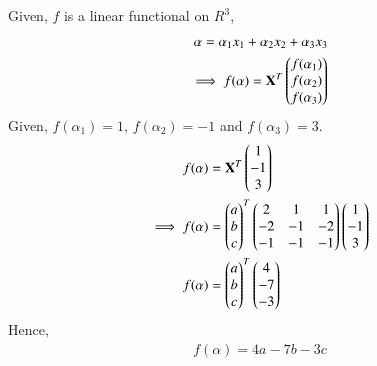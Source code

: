\documentclass[journal,12pt,twocolumn]{IEEEtran}
\begin{document}
Given, $f$ is a linear functional on $R^3$,
\begin{align}
\mathbf{\alpha} = \alpha_1 x_1 + \alpha_2 x_2 + \alpha_3 x_3\\
\implies f(\alpha) = \mathbf{X}^T \begin{pmatrix}f(\alpha_1)\\f(\alpha_2)\\f(\alpha_3)\end{pmatrix}
\end{align}
Given, $f(\alpha_1)=1$, $f(\alpha_2)=-1$ and $f(\alpha_3)=3$.
\begin{align}
 f(\alpha) &= \mathbf{X}^T \begin{pmatrix}1\\-1\\3\end{pmatrix}\\
\implies f(\alpha) &= \begin{pmatrix}a\\b\\c\end{pmatrix}^T\begin{pmatrix}2 &1&1\\-2&-1&-2 \\-1&-1&-1\end{pmatrix}\begin{pmatrix}1\\-1\\3\end{pmatrix}\\
f(\alpha)&=\begin{pmatrix}a\\b\\c\end{pmatrix}^T\begin{pmatrix}4\\-7\\-3\end{pmatrix}
\end{align}
Hence,
\begin{align}
f(\alpha)=4a-7b-3c
\end{align}
\end{document}
